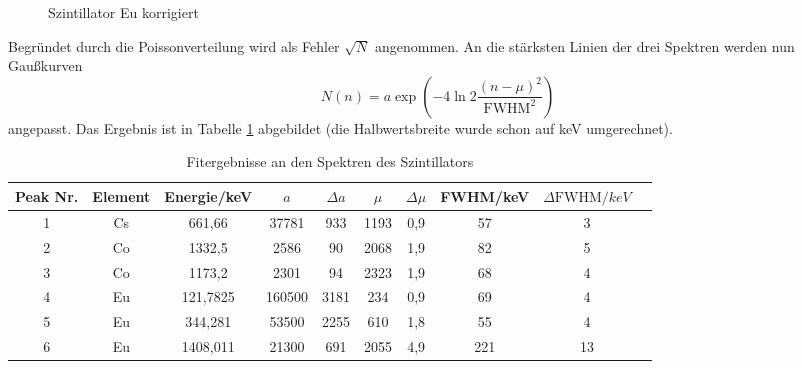 \begin{figure}[!h]
\centering
{}
\caption{Szintillator Eu korrigiert}
\label{fig:si_eu}
\end{figure}

Begründet durch die Poissonverteilung wird als Fehler $\sqrt{N}$ angenommen. An die stärksten Linien der drei Spektren werden nun Gaußkurven \[N(n) = a\exp{\left(-4\ln{2}\frac{(n-\mu)^2}{\text{FWHM}^2}\right)}\] angepasst. Das Ergebnis ist in Tabelle \ref{tab:si} abgebildet (die Halbwertsbreite wurde schon auf keV umgerechnet).

\begin{table}[h]
\caption{Fitergebnisse an den Spektren des Szintillators}
\begin{tabular}{cccccccccc}
\toprule
Peak Nr. & Element & Energie/\si{keV}& $a$ & $\Delta a$ & $\mu$ & $\Delta \mu$ & FWHM/\si{keV} & $\Delta \text{FWHM}/\si{keV}$\\
\midrule 
1	&	Cs	&	661,66	&	37781	&	933	&	1193	&	0,9	&	57	&	3\\
2	&	Co	&	1332,5	&	2586	&	90	&	2068	&	1,9	&	82	&	5\\
3	&	Co	&	1173,2	&	2301	&	94	&	2323	&	1,9	&	68	&	4\\
4	&	Eu	&	121,7825	&	160500	&	3181	&	234	&	0,9	&	69	&	4\\
5	&	Eu	&	344,281	&	53500	&	2255	&	610	&	1,8	&	55	&	4\\
6	&	Eu	&	1408,011	&	21300	&	691	&	2055	&	4,9	&	221	&	13\\
\bottomrule
\end{tabular}
\label{tab:si}
\end{table}

